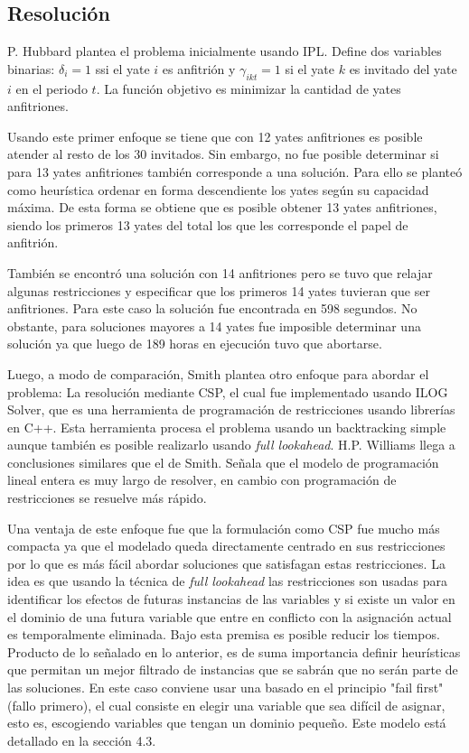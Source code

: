 \documentclass[letter, 10pt]{article}
\begin{document}
\subsection{Resolución}

P. Hubbard plantea el problema inicialmente usando IPL\cite{Smith1996}. Define dos variables binarias: $\delta_i=1$ ssi el yate $i$ es anfitrión y $\gamma_{ikt}=1$ si el yate $k$ es invitado del yate $i$ en el periodo $t$. La función objetivo es minimizar la cantidad de yates anfitriones.

Usando este primer enfoque se tiene que con 12 yates anfitriones es posible atender al resto de los 30 invitados. Sin embargo, no fue posible determinar si para 13 yates anfitriones también corresponde a una solución. Para ello se planteó como heurística ordenar en forma descendiente los yates según su capacidad máxima. De esta forma se obtiene que es posible obtener 13 yates anfitriones, siendo los primeros 13 yates del total los que les corresponde el papel de anfitrión.

También se encontró una solución con 14 anfitriones pero se tuvo que relajar algunas restricciones y especificar que los primeros 14 yates tuvieran que ser anfitriones. Para este caso la solución fue encontrada en 598 segundos. No obstante, para soluciones mayores a 14 yates fue imposible determinar una solución ya que luego de 189 horas en ejecución tuvo que abortarse.

Luego, a modo de comparación, Smith plantea otro enfoque para abordar el problema: La resolución mediante CSP, el cual fue implementado usando ILOG Solver\cite{Puget94ac++}, que es una herramienta de programación de restricciones usando librerías en C++. Esta herramienta procesa el problema usando un backtracking simple aunque también es posible realizarlo usando \textit{full lookahead}. H.P. Williams\cite{Williams92} llega a conclusiones similares que el de Smith. Señala que el modelo de programación lineal entera es muy largo de resolver, en cambio con programación de restricciones se resuelve más rápido.

Una ventaja de este enfoque fue que la formulación como CSP fue mucho más compacta ya que el modelado queda directamente centrado en sus restricciones por lo que es más fácil abordar soluciones que satisfagan estas restricciones. La idea es que usando la técnica de \textit{full lookahead} las restricciones son usadas para identificar los efectos de futuras instancias de las variables y si existe un valor en el dominio de una futura variable que entre en conflicto con la asignación actual es temporalmente eliminada. Bajo esta premisa es posible reducir los tiempos. Producto de lo señalado en lo anterior, es de suma importancia definir heurísticas que permitan un mejor filtrado de instancias que se sabrán que no serán parte de las soluciones. En este caso conviene usar una basado en el principio "fail first" (fallo primero), el cual consiste en elegir una variable que sea difícil de asignar, esto es, escogiendo variables que tengan un dominio pequeño\cite{Smith1996}. Este modelo está detallado en la sección 4.3.
\end{document}
